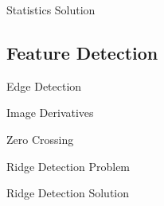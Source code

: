 \begin{frame}{Statistics Solution}
\end{frame}


%
%


\subsection{Feature Detection}
\begin{frame}{Edge Detection}
\end{frame}

\begin{frame}{Image Derivatives}
\end{frame}

\begin{frame}{Zero Crossing}
\end{frame}


\begin{frame}{Ridge Detection Problem}
\end{frame}

\begin{frame}{Ridge Detection Solution}
\end{frame}




